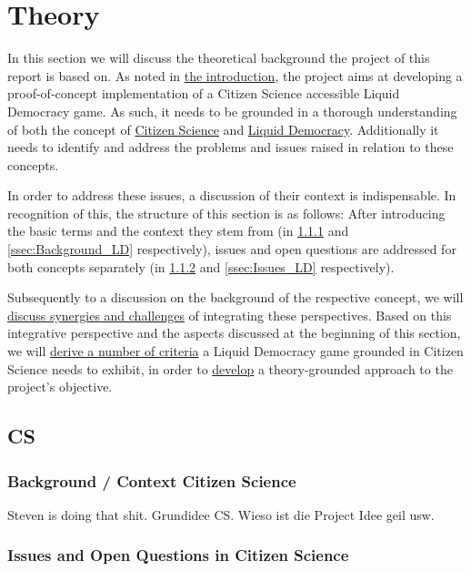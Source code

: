 \chapter{Theory}
\label{ch:Theory}

In this section we will discuss the theoretical background the project of this report is based on. As noted in \href{ssec:Objective}{the introduction}, the project aims at developing a proof-of-concept implementation of a Citizen Science accessible Liquid Democracy game. As such, it needs to be grounded in a thorough understanding of both the concept of \href{ssec:Theory_CS}{Citizen Science} and \href{ssec:Theory_LD}{Liquid Democracy}. Additionally it needs to identify and address the problems and issues raised in relation to these concepts. 

In order to address these issues, a discussion of their context is indispensable. In recognition of this, the structure of this section is as follows:
After introducing the basic terms and the context they stem from (in \ref{ssec:Background_CS} and \ref{ssec:Background_LD} respectively), issues and open questions are addressed for both concepts separately (in \ref{ssec:Issues_CS} and \ref{ssec:Issues_LD} respectively). 

Subsequently to a discussion on the background of the respective concept, we will \href{ssec:Integration_CSLD}{discuss synergies and challenges} of integrating these perspectives. Based on this integrative perspective and the aspects discussed at the beginning of this section, we will \href{ssec:Criteria}{derive a number of criteria} a Liquid Democracy game grounded in Citizen Science needs to exhibit, in order to \href{sec:Approach}{develop} a theory-grounded approach to the project's objective.
\section{CS}
\label{sec:Theory_CS}
\subsection{Background / Context Citizen Science}
\label{ssec:Background_CS}
Steven is doing that shit. Grundidee CS. Wieso ist die Project Idee geil usw.
\subsection{Issues and Open Questions in Citizen Science}
\label{ssec:Issues_CS}

\newpage


